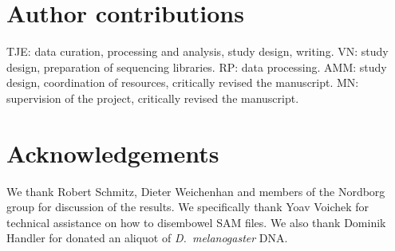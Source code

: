 \documentclass[10pt,draft,letterpaper]{article}
\begin{document}
\section*{Author contributions}

TJE: data curation, processing and analysis, study design, writing.
VN: study design, preparation of sequencing libraries.
RP: data processing.
AMM: study design, coordination of resources, critically revised the manuscript.
MN: supervision of the project, critically revised the manuscript.

\section*{Acknowledgements}

We thank Robert Schmitz, Dieter Weichenhan and members of the Nordborg group for discussion of the results.
We specifically thank Yoav Voichek for technical assistance on how to disembowel SAM files.
We also thank Dominik Handler for donated an aliquot of \emph{D.~melanogaster} DNA.

\nolinenumbers

% 
\end{document}
